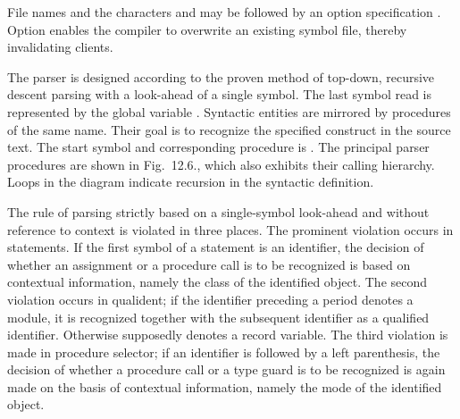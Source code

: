 \noindent File names and the characters  and \code{^} may be followed by an option specification . Option  enables the compiler to overwrite an existing symbol file, thereby invalidating clients.

The parser is designed according to the proven method of top-down, recursive descent parsing with a look-ahead of a single symbol. The last symbol read is represented by the global variable . Syntactic entities are mirrored by procedures of the same name. Their goal is to recognize the specified construct in the source text. The start symbol and corresponding procedure is . The principal parser procedures are shown in Fig.~12.6., which also exhibits their calling hierarchy. Loops in the diagram indicate recursion in the syntactic definition.


The rule of parsing strictly based on a single-symbol look-ahead and without reference to context is violated in three places. The prominent violation occurs in statements. If the first symbol of a statement is an identifier, the decision of whether an assignment or a procedure call is to be recognized is based on contextual information, namely the class of the identified object. The second violation occurs in qualident; if the identifier  preceding a period denotes a module, it is recognized together with the subsequent identifier as a qualified identifier. Otherwise  supposedly denotes a record variable. The third violation is made in procedure selector; if an identifier is followed by a left parenthesis, the decision of whether a procedure call or a type guard is to be recognized is again made on the basis of contextual information, namely the mode of the identified object.

